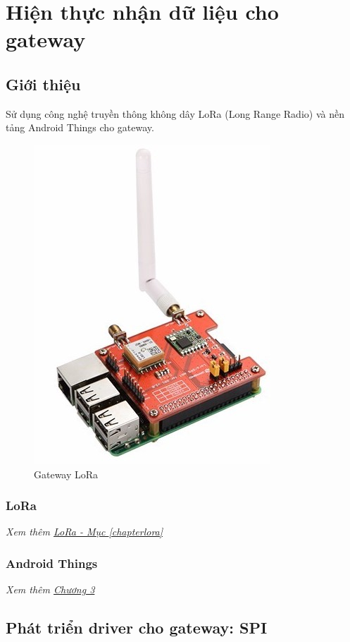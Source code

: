 \chapter{Hiện thực nhận dữ liệu cho gateway}
\section{Giới thiệu}
Sử dụng công nghệ truyền thông không dây LoRa \cite{tl12} (Long Range Radio) và nền tảng Android Things cho gateway.
\begin{center}
\begin{figure}[htp]
\begin{center}
\includegraphics[scale=0.55]{image5/lorahat.jpg}
\end{center}
\caption{Gateway LoRa}
\end{figure}
\end{center}
\subsection{LoRa}
\textit{Xem thêm \hyperref[chapterlora]{LoRa - Mục \ref{chapterlora}}}

\subsection{Android Things}
\textit{Xem thêm \hyperref[chapter3]{Chương 3}}

\section{Phát triển driver cho gateway: SPI}

